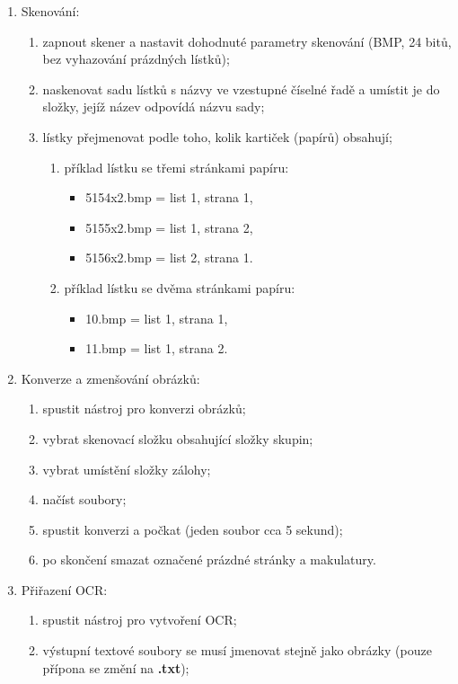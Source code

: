 \begin{enumerate}
\item{Skenování:}
\begin{enumerate}
\item{zapnout skener a nastavit dohodnuté parametry skenování (BMP, 24 bitů, bez vyhazování prázdných lístků);}
\item{naskenovat sadu lístků s názvy ve vzestupné číselné řadě a umístit je do složky, jejíž název odpovídá názvu sady;}
\item{lístky přejmenovat podle toho, kolik kartiček (papírů) obsahují;}
\begin{enumerate}
\item{příklad lístku se třemi stránkami papíru:}
\begin{itemize}
\item{5154x2.bmp = list 1, strana 1,}
\item{5155x2.bmp = list 1, strana 2,}
\item{5156x2.bmp = list 2, strana 1.}
\end{itemize}
\item{příklad lístku se dvěma stránkami papíru:}
\begin{itemize}
\item{10.bmp = list 1, strana 1,}
\item{11.bmp = list 1, strana 2.}
\end{itemize}
\end{enumerate}
\end{enumerate}
\item{Konverze a zmenšování obrázků:}
\begin{enumerate}
\item{spustit nástroj pro konverzi obrázků;}
\item{vybrat skenovací složku obsahující složky skupin;}
\item{vybrat umístění složky zálohy;}
\item{načíst soubory;}
\item{spustit konverzi a počkat (jeden soubor cca 5 sekund);}
\item{po skončení smazat označené prázdné stránky a makulatury.}
\end{enumerate}
\item{Přiřazení OCR:}
\begin{enumerate}
\item{spustit nástroj pro vytvoření OCR;}
\item{výstupní textové soubory se musí jmenovat stejně jako obrázky (pouze přípona se změní na {\bf .txt});}

\end{enumerate}
\end{enumerate}
